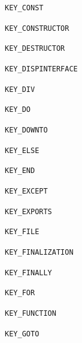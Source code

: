 \documentclass{report}
\begin{document}
\begin{list}{}
\begin{description}
\item[\texttt{KEY{\_}CONST}] \label{PasDoc_Tokenizer-KEY_CONST}
\index{}
 
\item[\texttt{KEY{\_}CONSTRUCTOR}] \label{PasDoc_Tokenizer-KEY_CONSTRUCTOR}
\index{}
 
\item[\texttt{KEY{\_}DESTRUCTOR}] \label{PasDoc_Tokenizer-KEY_DESTRUCTOR}
\index{}
 
\item[\texttt{KEY{\_}DISPINTERFACE}] \label{PasDoc_Tokenizer-KEY_DISPINTERFACE}
\index{}
 
\item[\texttt{KEY{\_}DIV}] \label{PasDoc_Tokenizer-KEY_DIV}
\index{}
 
\item[\texttt{KEY{\_}DO}] \label{PasDoc_Tokenizer-KEY_DO}
\index{}
 
\item[\texttt{KEY{\_}DOWNTO}] \label{PasDoc_Tokenizer-KEY_DOWNTO}
\index{}
 
\item[\texttt{KEY{\_}ELSE}] \label{PasDoc_Tokenizer-KEY_ELSE}
\index{}
 
\item[\texttt{KEY{\_}END}] \label{PasDoc_Tokenizer-KEY_END}
\index{}
 
\item[\texttt{KEY{\_}EXCEPT}] \label{PasDoc_Tokenizer-KEY_EXCEPT}
\index{}
 
\item[\texttt{KEY{\_}EXPORTS}] \label{PasDoc_Tokenizer-KEY_EXPORTS}
\index{}
 
\item[\texttt{KEY{\_}FILE}] \label{PasDoc_Tokenizer-KEY_FILE}
\index{}
 
\item[\texttt{KEY{\_}FINALIZATION}] \label{PasDoc_Tokenizer-KEY_FINALIZATION}
\index{}
 
\item[\texttt{KEY{\_}FINALLY}] \label{PasDoc_Tokenizer-KEY_FINALLY}
\index{}
 
\item[\texttt{KEY{\_}FOR}] \label{PasDoc_Tokenizer-KEY_FOR}
\index{}
 
\item[\texttt{KEY{\_}FUNCTION}] \label{PasDoc_Tokenizer-KEY_FUNCTION}
\index{}
 
\item[\texttt{KEY{\_}GOTO}] \label{PasDoc_Tokenizer-KEY_GOTO}
\index{}
 

\end{description}
\end{list}
\end{document}

